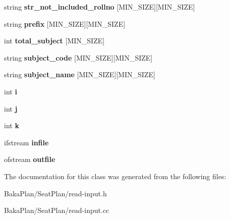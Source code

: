 \begin{DoxyCompactItemize}
\item 
\hypertarget{classReadInput_af8bf5dd02c9ad4baa9b3dad46de05584}{string {\bfseries str\-\_\-not\-\_\-included\-\_\-rollno} \mbox{[}M\-I\-N\-\_\-\-S\-I\-Z\-E\mbox{]}\mbox{[}M\-I\-N\-\_\-\-S\-I\-Z\-E\mbox{]}}\label{classReadInput_af8bf5dd02c9ad4baa9b3dad46de05584}

\item 
\hypertarget{classReadInput_a22e77d892c3c600f6d1344c54d0953dd}{string {\bfseries prefix} \mbox{[}M\-I\-N\-\_\-\-S\-I\-Z\-E\mbox{]}\mbox{[}M\-I\-N\-\_\-\-S\-I\-Z\-E\mbox{]}}\label{classReadInput_a22e77d892c3c600f6d1344c54d0953dd}

\item 
\hypertarget{classReadInput_a6104862202913ac59bae308e9f61fbd5}{int {\bfseries total\-\_\-subject} \mbox{[}M\-I\-N\-\_\-\-S\-I\-Z\-E\mbox{]}}\label{classReadInput_a6104862202913ac59bae308e9f61fbd5}

\item 
\hypertarget{classReadInput_ad54949b5b77968f69e6459e24aa29cd8}{string {\bfseries subject\-\_\-code} \mbox{[}M\-I\-N\-\_\-\-S\-I\-Z\-E\mbox{]}\mbox{[}M\-I\-N\-\_\-\-S\-I\-Z\-E\mbox{]}}\label{classReadInput_ad54949b5b77968f69e6459e24aa29cd8}

\item 
\hypertarget{classReadInput_aed16990a1fd7dfc21c69fbf07892c256}{string {\bfseries subject\-\_\-name} \mbox{[}M\-I\-N\-\_\-\-S\-I\-Z\-E\mbox{]}\mbox{[}M\-I\-N\-\_\-\-S\-I\-Z\-E\mbox{]}}\label{classReadInput_aed16990a1fd7dfc21c69fbf07892c256}

\item 
\hypertarget{classReadInput_aa5794ec3922f26d376dba09946e73178}{int {\bfseries i}}\label{classReadInput_aa5794ec3922f26d376dba09946e73178}

\item 
\hypertarget{classReadInput_a9cff282fd247d9eca49c1acde4d08b11}{int {\bfseries j}}\label{classReadInput_a9cff282fd247d9eca49c1acde4d08b11}

\item 
\hypertarget{classReadInput_a28d5df9f425e54bb3575bdcc4d41a4d1}{int {\bfseries k}}\label{classReadInput_a28d5df9f425e54bb3575bdcc4d41a4d1}

\item 
\hypertarget{classReadInput_a0d12e64fa5ff8c210f5ac494021318ae}{ifstream {\bfseries infile}}\label{classReadInput_a0d12e64fa5ff8c210f5ac494021318ae}

\item 
\hypertarget{classReadInput_aa25ad1c8e7ef638eddc2ffb96e1c49c2}{ofstream {\bfseries outfile}}\label{classReadInput_aa25ad1c8e7ef638eddc2ffb96e1c49c2}

\end{DoxyCompactItemize}


The documentation for this class was generated from the following files\-:\begin{DoxyCompactItemize}
\item 
Baka\-Plan/\-Seat\-Plan/read-\/input.\-h\item 
Baka\-Plan/\-Seat\-Plan/read-\/input.\-cc\end{DoxyCompactItemize}
